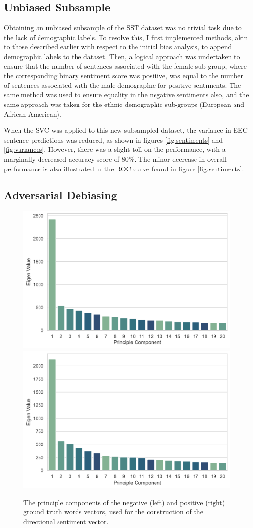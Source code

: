 \documentclass[a4paper]{IEEEtran}
\begin{document}
\subsection{Unbiased Subsample}

Obtaining an unbiased subsample of the SST dataset was no trivial task due to the lack of demographic labels. To resolve this, I first implemented methods, akin to those described earlier with respect to the initial bias analysis, to append demographic labels to the dataset. Then, a logical approach was undertaken to ensure that the number of sentences associated with the female sub-group, where the corresponding binary sentiment score was positive, was equal to the number of sentences associated with the male demographic for positive sentiments. The same method was used to ensure equality in the negative sentiments also, and the same approach was taken for the ethnic demographic sub-groups (European and African-American). 

When the SVC was applied to this new subsampled dataset, the variance in EEC sentence predictions was reduced, as shown in figures \ref{fig:sentiments} and \ref{fig:variances}. However, there was a slight toll on the performance, with a marginally decreased accuracy score of 80\%. The minor decrease in overall performance is also illustrated in the ROC curve found in figure \ref{fig:sentiments}.

\subsection{Adversarial Debiasing}

\begin{figure}[htbp]
\centerline{\includegraphics[width=0.4\linewidth]{images/pca-neg.png}
\includegraphics[width=0.4\linewidth]{images/pca-pos.png}}
\caption{The principle components of the negative (left) and positive (right) ground truth words vectors, used for the construction of the directional sentiment vector.}
\label{fig:pca}
\end{figure}
\end{document}
